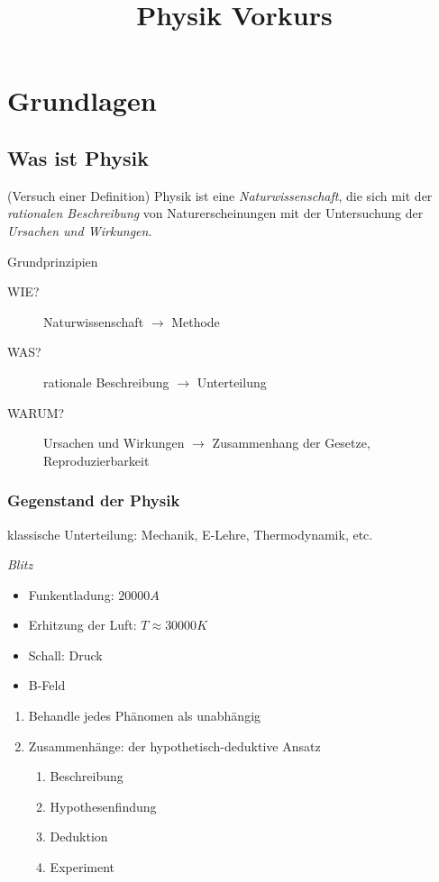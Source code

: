 \documentclass[a4paper,10pt]{scrartcl}
\title{Physik Vorkurs}
\begin{document}
\maketitle

\tableofcontents
\newpage
\section{Grundlagen}
\subsection{Was ist Physik}
\begin{seg}{(Versuch einer Definition)}
 Physik ist eine \emph{Naturwissenschaft}, die sich mit der \emph{rationalen Beschreibung} von Naturerscheinungen mit der Untersuchung der \emph{Ursachen und Wirkungen}.
\end{seg}
\begin{seg}{Grundprinzipien}

\begin{description}
 \item[WIE?] Naturwissenschaft $\longrightarrow$ Methode
 \item[WAS?] rationale Beschreibung $\longrightarrow$ Unterteilung
 \item[WARUM?] Ursachen und Wirkungen $\longrightarrow$ Zusammenhang der Gesetze, Reproduzierbarkeit
\end{description}
\end{seg}

\subsubsection{Gegenstand der Physik}
\begin{seg}{klassische Unterteilung:} 
 Mechanik, E-Lehre, Thermodynamik, etc.
\end{seg}
\begin{ex*} \emph{Blitz}
 \begin{itemize}
  \item Funkentladung: $20000 A$
  \item Erhitzung der Luft: $T \approx 30000 K$
  \item Schall: Druck
  \item B-Feld
 \end{itemize}

\end{ex*}

\begin{enumerate}
 \item Behandle jedes Phänomen als unabhängig
 \item Zusammenhänge: der hypothetisch-deduktive Ansatz
\begin{enumerate}
 \item Beschreibung
 \item Hypothesenfindung
 \item Deduktion
 \item Experiment
\end{enumerate}

\end{enumerate}
\end{document}
